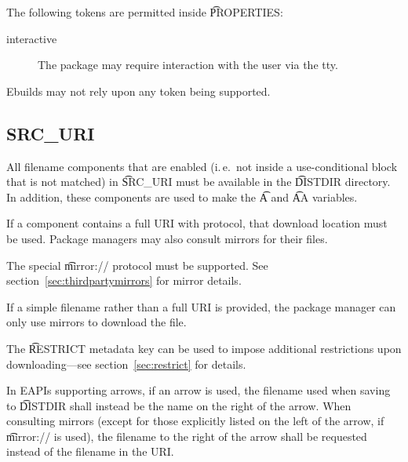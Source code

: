 The following tokens are permitted inside \t{PROPERTIES}:

\begin{description}
\item[interactive] The package may require interaction with the user via the tty.
\end{description}

Ebuilds may not rely upon any token being supported.

\subsection{SRC_URI}
\label{sec:src-uri-behaviour}

All filename components that are enabled (i.\,e.\ not inside a use-conditional block that is not
matched) in \t{SRC_URI} must be available in the \t{DISTDIR} directory. In addition, these
components are used to make the \t{A} and \t{AA} variables.

If a component contains a full URI with protocol, that download location must be used. Package
managers may also consult mirrors for their files.

The special \t{mirror://} protocol must be supported. See section~\ref{sec:thirdpartymirrors} for mirror
details.

If a simple filename rather than a full URI is provided, the package manager can only use mirrors to
download the file.

The \t{RESTRICT} metadata key can be used to impose additional restrictions upon downloading---see
section~\ref{sec:restrict} for details.

 In EAPIs supporting arrows, if an arrow is used, the filename used
when saving to \t{DISTDIR} shall instead be the name on the right of the arrow. When consulting
mirrors (except for those explicitly listed on the left of the arrow, if \t{mirror://} is used), the
filename to the right of the arrow shall be requested instead of the filename in the URI.


